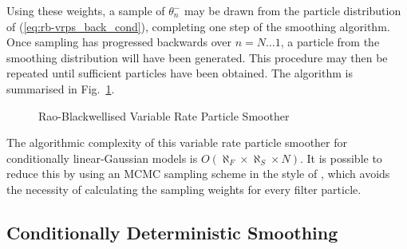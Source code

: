 \documentclass[peerreview,11pt,draftcls,onecolumn]{IEEEtran}
\begin{document}
Using these weights, a sample of $\theta_{n}^-$ may be drawn from the particle distribution of (\ref{eq:rb-vrps_back_cond}), completing one step of the smoothing algorithm. Once sampling has progressed backwards over $n=N \dots 1$, a particle from the smoothing distribution will have been generated. This procedure may then be repeated until sufficient particles have been obtained. The algorithm is summarised in Fig.~\ref{alg:RBVRPS}.

\begin{figure}
\caption{Rao-Blackwellised Variable Rate Particle Smoother}
\label{alg:RBVRPS}
\end{figure}

The algorithmic complexity of this variable rate particle smoother for conditionally linear-Gaussian models is $O(\aleph_F \times \aleph_S \times N)$. It is possible to reduce this by using an MCMC sampling scheme in the style of \cite{Bunch2012}, which avoids the necessity of calculating the sampling weights for every filter particle.



\subsection{Conditionally Deterministic Smoothing} \label{sec:pd-vrps}
\end{document}
